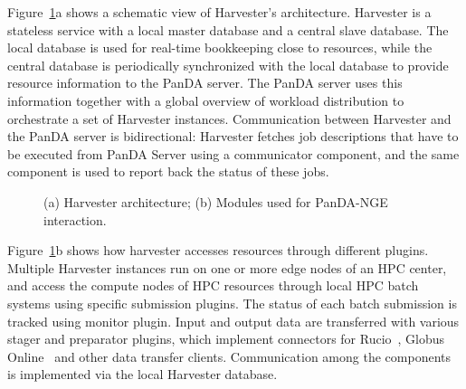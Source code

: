\documentclass{webofc}
\begin{document}
Figure~\ref{fig:harvester}a shows a schematic view of Harvester's
architecture. Harvester is a stateless service with a local master database
and a central slave database. The local database is used for real-time
bookkeeping close to resources, while the central database is periodically
synchronized with the local database to provide resource information to the
PanDA server. The PanDA server uses this information together with a global
overview of workload distribution to orchestrate a set of Harvester
instances. Communication between Harvester and the PanDA server is
bidirectional: Harvester fetches job descriptions that have to be executed
from PanDA Server using a communicator component, and the same component is
used to report back the status of these jobs.

\begin{figure}
    \centering
    \qquad
    \caption{(a) Harvester architecture; (b) Modules used for PanDA-NGE interaction.}
    \label{fig:harvester}%
\end{figure}

Figure~\ref{fig:harvester}b shows how harvester accesses resources
through different plugins. Multiple Harvester instances run on one or more
edge nodes of an HPC center, and access the compute nodes of HPC resources
through local HPC batch systems using specific submission plugins. The status
of each batch submission is tracked using monitor plugin. Input and output
data are transferred with various stager and preparator plugins, which
implement connectors for Rucio~\citep{garonne2014rucio}, Globus
Online~\citep{foster2011globus} and other data transfer clients. Communication
among the components is implemented via the local Harvester database.
\end{document}

